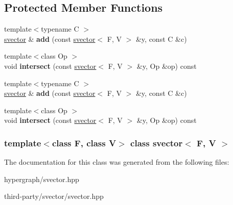 \subsection*{Protected Member Functions}
\begin{DoxyCompactItemize}
\item 
\hypertarget{classsvector_aab15a76cc91f699acf5baa85f11439b3}{
{\footnotesize template$<$typename C $>$ }\\\hyperlink{classsvector}{svector} \& {\bfseries add} (const \hyperlink{classsvector}{svector}$<$ F, V $>$ \&y, const C \&c)}
\label{classsvector_aab15a76cc91f699acf5baa85f11439b3}

\item 
\hypertarget{classsvector_a90ac317ae34f85b27980004cc0282e9d}{
{\footnotesize template$<$class Op $>$ }\\void {\bfseries intersect} (const \hyperlink{classsvector}{svector}$<$ F, V $>$ \&y, Op \&op) const }
\label{classsvector_a90ac317ae34f85b27980004cc0282e9d}

\item 
\hypertarget{classsvector_aab15a76cc91f699acf5baa85f11439b3}{
{\footnotesize template$<$typename C $>$ }\\\hyperlink{classsvector}{svector} \& {\bfseries add} (const \hyperlink{classsvector}{svector}$<$ F, V $>$ \&y, const C \&c)}
\label{classsvector_aab15a76cc91f699acf5baa85f11439b3}

\item 
\hypertarget{classsvector_a90ac317ae34f85b27980004cc0282e9d}{
{\footnotesize template$<$class Op $>$ }\\void {\bfseries intersect} (const \hyperlink{classsvector}{svector}$<$ F, V $>$ \&y, Op \&op) const }
\label{classsvector_a90ac317ae34f85b27980004cc0282e9d}

\end{DoxyCompactItemize}
\subsubsection*{template$<$class F, class V$>$ class svector$<$ F, V $>$}



The documentation for this class was generated from the following files:\begin{DoxyCompactItemize}
\item 
hypergraph/svector.hpp\item 
third-\/party/svector/svector.hpp\end{DoxyCompactItemize}
